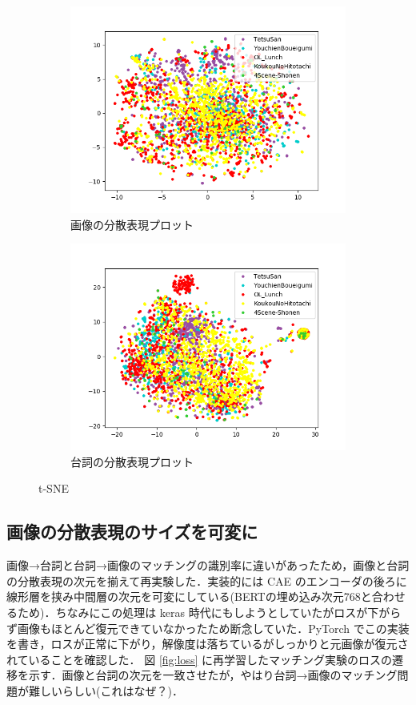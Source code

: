 \documentclass[onecolumn]{ujarticle}   %
\begin{document}
	\begin{figure}[h]
		\centering
		\begin{subfigure}{0.9\columnwidth}
			\centering
			\includegraphics[width=0.9\columnwidth]{data/t_sne_img_80.png}
				\caption{画像の分散表現プロット}
		\end{subfigure}
		\begin{subfigure}{0.9\columnwidth}
			\centering
			\includegraphics[width=0.9\columnwidth]{data/t_sne_serif_80.png}
				\caption{台詞の分散表現プロット}
		\end{subfigure}
		\caption{t-SNE}
		\label{fig:t-SNE}
	\end{figure}

	\subsection{画像の分散表現のサイズを可変に}
	画像→台詞と台詞→画像のマッチングの識別率に違いがあったため，画像と台詞の分散表現の次元を揃えて再実験した．実装的には CAE のエンコーダの後ろに線形層を挟み中間層の次元を可変にしている(BERTの埋め込み次元768と合わせるため)．ちなみにこの処理は keras 時代にもしようとしていたがロスが下がらず画像もほとんど復元できていなかったため断念していた．PyTorch でこの実装を書き，ロスが正常に下がり，解像度は落ちているがしっかりと元画像が復元されていることを確認した．
	図 \ref{fig:loss} に再学習したマッチング実験のロスの遷移を示す．画像と台詞の次元を一致させたが，やはり台詞→画像のマッチング問題が難しいらしい(これはなぜ？)．
\end{document}
